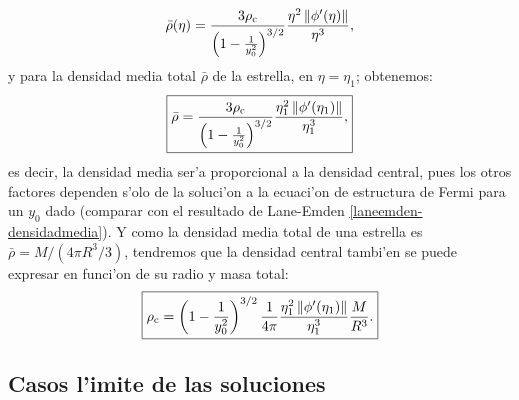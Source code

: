 \begin{align}
\bar{\rho}(\eta)=\frac{3\rho_{\rm c}}{\left(1-\frac{1}{y_0^2}\right)^{3/2}}\frac{\eta^2\left\Vert\phi'(\eta)\right\Vert}{\eta^3},
\end{align}
y para la densidad media total $\bar{\rho}$ de la estrella, en $\eta=\eta_1$; obtenemos:
\begin{align}\label{ec-fermi-densidadmediaycentral}
\boxed{\bar{\rho}=\frac{3\rho_{\rm c}}{\left(1-\frac{1}{y_0^2}\right)^{3/2}}\frac{\eta_1^2\left\Vert\phi'(\eta_1)\right\Vert}{\eta_1^3},}
\end{align}
es decir, la densidad media ser'a proporcional a la densidad central, pues los otros factores dependen s'olo de la soluci'on a la ecuaci'on de estructura de Fermi para un $y_0$ dado (comparar con el resultado de Lane-Emden \eqref{laneemden-densidadmedia}). Y como la densidad media total de una estrella es $\bar{\rho}=M/(4\pi R^3/3)$, tendremos que la densidad central tambi'en se puede expresar en funci'on de su radio y masa total:
\begin{equation}
\boxed{ \rho_{\rm c}=\left(1-\frac{1}{y_0^2}\right)^{3/2}\frac{1}{4\pi}\frac{\eta_1^2\left\Vert\phi'(\eta_1)\right\Vert}{\eta_1^3}\frac{M}{R^3}.}
\end{equation}



\subsection{Casos l'imite de las soluciones}\label{sec:ec-fermi-limites}

